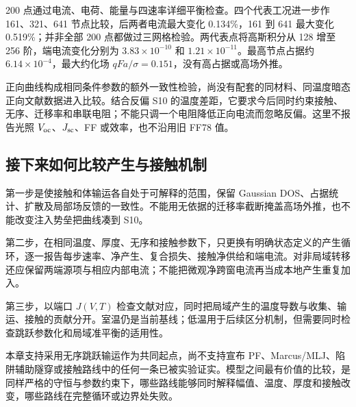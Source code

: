 200 {\cjkfont 点通过电流、电荷、能量与四速率详细平衡检查。四个代表工况进一步作}\allowbreak{} 161{\cjkfont 、}\allowbreak{}321{\cjkfont 、}\allowbreak{}641 {\cjkfont 节点比较，后两者电流最大变化}\allowbreak{} 0.134\%{\cjkfont ，}\allowbreak{}161 {\cjkfont 到}\allowbreak{} 641 {\cjkfont 最大变化}\allowbreak{} 0.519\%{\cjkfont ；并非全部}\allowbreak{} 200 {\cjkfont 点都做过三网格检验。两代表点将高斯积分从}\allowbreak{} 128 {\cjkfont 增至}\allowbreak{} 256 {\cjkfont 阶，端电流变化分别为}\allowbreak{} $3.83\times10^{-10}$ {\cjkfont 和}\allowbreak{} $1.21\times10^{-11}${\cjkfont 。最高节点占据约}\allowbreak{} $6.14\times10^{-4}${\cjkfont ，最大约化场}\allowbreak{} $qFa/\sigma=0.151${\cjkfont ，没有高占据或高场外推。}\allowbreak{}

{\cjkfont 正向曲线构成相同条件参数的额外一致性检验，尚没有配套的同材料、同温度暗态正向文献数据进入比较。结合反偏}\allowbreak{} S10 {\cjkfont 的温度差距，它要求今后同时约束接触、无序、迁移率和串联电阻；不能只调一个电阻降低正向电流而忽略反偏。这里不报告光照}\allowbreak{} $V_{\rm oc}${\cjkfont 、}\allowbreak{}$J_{\rm sc}${\cjkfont 、}\allowbreak{}FF {\cjkfont 或效率，也不沿用旧}\allowbreak{} FF78 {\cjkfont 值。}\allowbreak{}


\subsection{{\cjkfont 接下来如何比较产生与接触机制}\allowbreak{}}
{\cjkfont 第一步是使接触和体输运各自处于可解释的范围，保留}\allowbreak{} Gaussian DOS{\cjkfont 、占据统计、扩散及局部场反馈的一致性。不能用无依据的迁移率截断掩盖高场外推，也不能改变注入势垒把曲线凑到}\allowbreak{} S10{\cjkfont 。}\allowbreak{}

{\cjkfont 第二步，在相同温度、厚度、无序和接触参数下，只更换有明确状态定义的产生循环，逐一报告每步速率、净产生、复合损失、接触净供给和端电流。对非局域转移还应保留两端源项与相应内部电流；不能把微观净跨窗电流再当成本地产生重复加入。}\allowbreak{}

{\cjkfont 第三步，以端口}\allowbreak{} $J(V,T)$ {\cjkfont 检查文献对应，同时把局域产生的温度导数与收集、输运、接触的贡献分开。室温仍是当前基线；低温用于后续区分机制，但需要同时检查跳跃参数化和局域准平衡的适用性。}\allowbreak{}

{\cjkfont 本章支持采用无序跳跃输运作为共同起点，尚不支持宣布}\allowbreak{} PF{\cjkfont 、}\allowbreak{}Marcus/MLJ{\cjkfont 、陷阱辅助隧穿或接触路线中的任何一条已被实验证实。模型之间最有价值的比较，是同样严格的守恒与参数约束下，哪些路线能够同时解释幅值、温度、厚度和接触改变，哪些路线在完整循环或边界处失败。}\allowbreak{}

